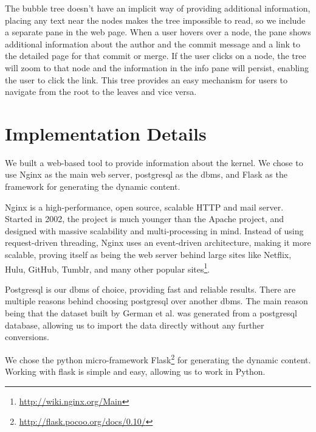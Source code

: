 \documentclass[conference, draftclsnofoot, draft]{IEEEtran}
\begin{document}
The bubble tree doesn't have an implicit way of providing additional information,
placing any text near the nodes makes the tree impossible to read, so we include a
separate pane in the web page. When a user hovers over a node, the pane shows
additional information about the author and the commit message and a link to the
detailed page for that commit or merge. If the user clicks on a node, the tree will
zoom to that node and the information in the info pane will persist, enabling the
user to click the link. This tree provides an easy mechanism for users to navigate
from the root to the leaves and vice versa.

\section{Implementation Details}


We built a web-based tool to provide information about the kernel.  We chose to use
Nginx as the main web server, postgresql as the dbms, and Flask as the framework for
generating the dynamic content.

Nginx is a high-performance, open source, scalable HTTP and mail server. Started in
2002, the project is much younger than the Apache project, and designed with massive
scalability and multi-processing in mind. Instead of using request-driven threading,
Nginx uses an event-driven architecture, making it more scalable, proving itself as
being the web server behind large sites like Netflix, Hulu, GitHub, Tumblr, and many
other popular sites\footnote{\url{http://wiki.nginx.org/Main}}.

Postgresql is our dbms of choice, providing fast and reliable results. There are
multiple reasons behind choosing postgresql over another dbms. The main reason being
that the dataset built by German et al. was generated from a postgresql database,
allowing us to import the data directly without any further conversions.

We chose the python micro-framework
Flask\footnote{\url{http://flask.pocoo.org/docs/0.10/}} for generating the dynamic
content. Working with flask is simple and easy, allowing us to work in Python.
\end{document}
